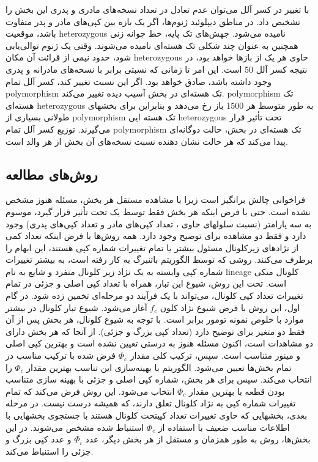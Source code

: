 با تغییر در کسر آلل می‌توان عدم تعادل در تعداد نسخه‌های مادری و پدری این بخش را تشخیص داد. در مناطق دیپلوئید ژنوم‌ها، اگر یک بازه بین کپی‌های مادر و پدر متفاوت باشد، موقعیت \gls{heterozygous} نامیده می‌شود. جهش‌های تک پایه، خط جوانه زنی همچنین به عنوان چند شکلی تک هسته‌ای نامیده می‌شوند. وقتی یک ژنوم توالی‌یابی شود، حدود نیمی از قرائت آن مکان \gls{heterozygous} حاوی هر یک از بازها خواهد بود، در نتیجه کسر آلل 50 است. این امر تا زمانی که نسبتی برابر با نسخه‌های مادرانه و پدری وجود داشته باشد، صادق خواهد بود. اگر این نسبت تغییر کند، کسر آلل  تمام \gls{polymorphism} تک هسته‌ای در بخش آسیب دیده تغییر می‌کند. \gls{polymorphism} تک هسته‌ای \gls{heterozygous} به طور متوسط هر 1500 باز \cite{chen2012personal} رخ می‌دهد و بنابراین برای بخشهای طولانی بسیاری از \gls{polymorphism} تک هسته ایی \gls{heterozygous} تحت تأثیر قرار می‌گیرند. توزیع کسر آلل  تمام \gls{polymorphism} تک هسته‌ای در بخش، حالت دوگانه‌ای پیدا می‌کند که هر حالت نشان دهنده نسبت نسخه‌های آن بخش از هر والد است.

\subsection{روش‌های مطالعه}

فراخوانی  چالش برانگیز است زیرا با مشاهده مستقل هر بخش، مسئله هنوز مشخص نشده است. حتی با فرض اینکه هر بخش فقط توسط یک  تحت تأثیر قرار گیرد،  موسوم به سه پارامتر (نسبت سلولهای حاوی ، تعداد کپی‌های مادر و تعداد کپی‌های پدری) وجود دارد و فقط دو مشاهده برای توضیح وجود دارد.
همه روش‌ها با فرض اینکه تعداد کمی از نژادهای زیرکلونال مسئول بیشتر یا تمام تغییرات شماره کپی هستند، این ابهام را برطرف می‌کنند. روشی که توسط الگوریتم باتنبرگ \cite{nik2012life} به کار رفته است، به بیشتر تغییرات شماره کپی وابسته به یک نژاد زیر کلونال منفرد و شایع به نام \gls{lineage} کلونال متکی است. تحت این روش، شیوع این تبار، همراه با تعداد کپی اصلی و جزئی در تمام تغییرات تعداد کپی کلونال، می‌تواند با یک فرآیند دو مرحله‌ای تخمین زده شود. در گام اول، این روش با فرض شیوع نژاد کلون $f_c$  آغاز می‌شود. شیوع تبار کلونال در بیشتر موارد با خلوص نمونه تومور برابر است. با توجه به شیوع کلونال، هر بخش پس از آن فقط دو متغیر برای توضیح دارد (تعداد کپی بزرگ و جزئی). از آنجا که هر بخش دارای دو مشاهدات است، اکنون مسئله هنوز به درستی تعیین نشده است و بهترین کپی اصلی و مینور متناسب است. سپس، ترکیب کلی مقدار $\Phi_c$  فرض شده با ترکیب مناسب در تمام بخش‌ها تعیین می‌شود. الگوریتم با بهینه‌سازی این تناسب بهترین مقدار $\Phi_c$  را انتخاب می‌کند. سپس برای هر بخش، شماره کپی اصلی و جزئی با بهینه سازی متناسب بودن قطعه با بهترین مقدار $\Phi_c$   انتخاب می‌شود. این روش فرض می‌کند که تمام تغییرات شماره کپی به نژاد کلونال تعلق دارند، که همیشه درست نیست. در مرحله بعدی، بخشهایی که حاوی تغییرات تعداد کپیتحت کلونال هستند با جستجوی بخشهایی با اطلاعات مناسب ضعیف با استفاده از $\Phi_c$   استنباط شده مشخص می‌شوند. در این بخش‌ها، روش به طور همزمان و مستقل از هر بخش دیگر، عدد $\Phi_i$ و عدد کپی بزرگ و جزئی را استنباط می‌کند.


